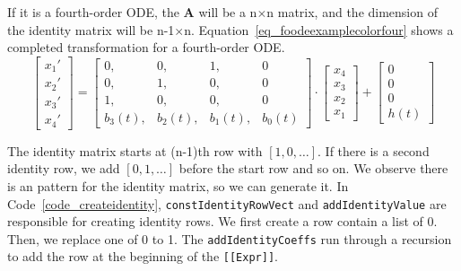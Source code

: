 If it is a fourth-order ODE, the \textbf{A} will be a n$\times$n matrix, and the dimension of the identity matrix will be n-1$\times$n. Equation~\ref{eq_foodeexamplecolorfour} shows a completed transformation for a fourth-order ODE.
\begin{equation} \label{eq_foodeexamplecolorfour}
	\begin{bmatrix}
		{x_{1}'} \\
    {x_{2}'} \\
    {x_{3}'} \\
    {x_{4}'}
	\end{bmatrix}
    = 
  \begin{bmatrix}
		{0}, & {0}, & {1}, & {0} \\
    {0}, & {1}, & {0}, & {0} \\
    {1}, & {0}, & {0}, & {0} \\
    {b_{3}(t)}, & {b_{2}(t)}, & {b_{1}(t)}, & {b_{0}(t)}
	\end{bmatrix}
    \cdot
  \begin{bmatrix}
		{x_{4}} \\
    {x_{3}} \\
    {x_{2}} \\
    {x_{1}}
	\end{bmatrix}
    + 
  \begin{bmatrix}
    {0} \\
    {0} \\
    {0} \\
    {h(t)}
	\end{bmatrix}
\end{equation}

The identity matrix starts at (n-1)th row with $[1, 0, \dots]$. If there is a second identity row, we add $[0, 1, \dots]$ before the start row and so on. We observe there is an pattern for the identity matrix, so we can generate it. In Code~\ref{code_createidentity}, \verb|constIdentityRowVect| and \verb|addIdentityValue| are responsible for creating identity rows. We first create a row contain a list of 0. Then, we replace one of 0 to 1. The \verb|addIdentityCoeffs| run through a recursion to add the row at the beginning of the \verb|[[Expr]]|.

